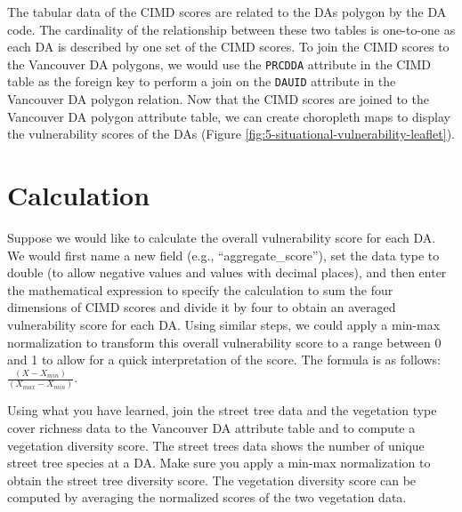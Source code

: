 \documentclass[
]{book}
\begin{document}
The tabular data of the CIMD scores are related to the DAs polygon by the DA code. The cardinality of the relationship between these two tables is one-to-one as each DA is described by one set of the CIMD scores. To join the CIMD scores to the Vancouver DA polygons, we would use the \texttt{PRCDDA} attribute in the CIMD table as the foreign key to perform a join on the \texttt{DAUID} attribute in the Vancouver DA polygon relation. Now that the CIMD scores are joined to the Vancouver DA polygon attribute table, we can create choropleth maps to display the vulnerability scores of the DAs (Figure \ref{fig:5-situational-vulnerability-leaflet}).

\hypertarget{calculation}{%
\section{Calculation}\label{calculation}}

Suppose we would like to calculate the overall vulnerability score for each DA. We would first name a new field (e.g., ``aggregate\_score''), set the data type to double (to allow negative values and values with decimal places), and then enter the mathematical expression to specify the calculation to sum the four dimensions of CIMD scores and divide it by four to obtain an averaged vulnerability score for each DA. Using similar steps, we could apply a min-max normalization to transform this overall vulnerability score to a range between 0 and 1 to allow for a quick interpretation of the score. The formula is as follows: \(\frac{(X - X_{min})}{(X_{max} - X_{min})}\).

Using what you have learned, join the street tree data and the vegetation type cover richness data to the Vancouver DA attribute table and to compute a vegetation diversity score. The street trees data shows the number of unique street tree species at a DA. Make sure you apply a min-max normalization to obtain the street tree diversity score. The vegetation diversity score can be computed by averaging the normalized scores of the two vegetation data.
\end{document}

